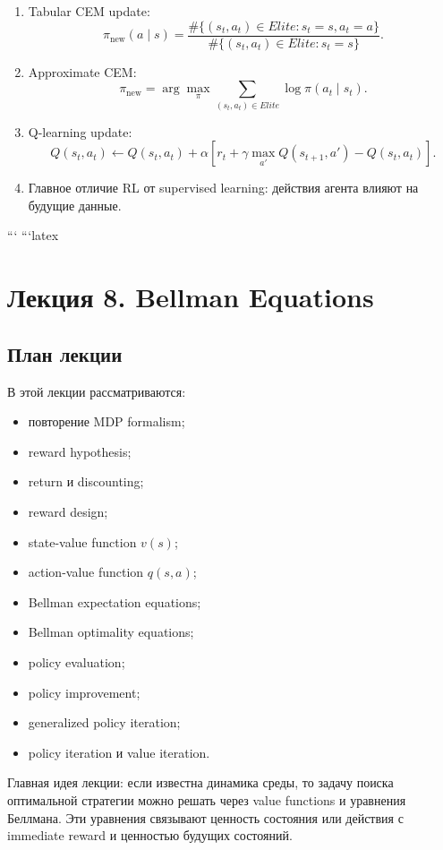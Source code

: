 \documentclass[a4paper,12pt]{article}
\begin{document}
\begin{enumerate}
    \item Tabular CEM update:
    \[
    \pi_{\text{new}}(a \mid s)
    =
    \frac{
    \#\{(s_t,a_t)\in Elite: s_t=s, a_t=a\}
    }{
    \#\{(s_t,a_t)\in Elite: s_t=s\}
    }.
    \]

    \item Approximate CEM:
    \[
    \pi_{\text{new}}
    =
    \arg\max_\pi
    \sum_{(s_t,a_t)\in Elite}
    \log \pi(a_t \mid s_t).
    \]

    \item Q-learning update:
    \[
    Q(s_t,a_t)
    \leftarrow
    Q(s_t,a_t)
    +
    \alpha
    \left[
    r_t
    +
    \gamma\max_{a'}Q(s_{t+1},a')
    -
    Q(s_t,a_t)
    \right].
    \]

    \item Главное отличие RL от supervised learning:
    действия агента влияют на будущие данные.
\end{enumerate}
```
```latex
\section{Лекция 8. Bellman Equations}

\subsection{План лекции}

В этой лекции рассматриваются:

\begin{itemize}
    \item повторение MDP formalism;
    \item reward hypothesis;
    \item return и discounting;
    \item reward design;
    \item state-value function \(v(s)\);
    \item action-value function \(q(s,a)\);
    \item Bellman expectation equations;
    \item Bellman optimality equations;
    \item policy evaluation;
    \item policy improvement;
    \item generalized policy iteration;
    \item policy iteration и value iteration.
\end{itemize}

Главная идея лекции: если известна динамика среды, то задачу поиска оптимальной стратегии можно решать через value functions и уравнения Беллмана. Эти уравнения связывают ценность состояния или действия с immediate reward и ценностью будущих состояний.
\end{document}
